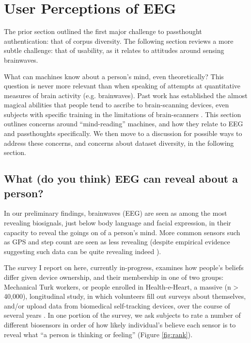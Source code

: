 \documentclass[sigconf]{acmart}
\begin{document}
\section{User Perceptions of EEG}
\label{sec:orgb5062f2}

The prior section outlined the first major challenge to passthought authentication: that of corpus diversity.
The following section reviews a more subtle challenge: that of usability, as it relates to attitudes around sensing brainwaves.

What can machines know about a person's mind, even theoretically? 
This question is never more relevant than when speaking of attempts at quantitative measures of brain activity (e.g. brainwaves).
Past work has established the almost magical abilities that people tend to ascribe to brain-scanning devices, even subjects with specific training in the limitations of brain-scanners \cite{Ali2014a}.
This section outlines concerns around ``mind-reading'' machines, and how they relate to EEG and passthoughts specifically.
We then move to a discussion for possible ways to address these concerns, and concerns about dataset diversity, in the following section.

\subsection{What (do you think) EEG can reveal about a person?}
\label{sec:orgbe3e326}

In our preliminary findings, brainwaves (EEG) are seen as among the most revealing biosignals, just below body language and facial expression, in their capacity to reveal the goings on of a person's mind. 
More common sensors such as GPS and step count are seen as less revealing (despite empirical evidence suggesting such data can be quite revealing indeed \cite{Canzian2015}).

The survey I report on here, currently in-progress, examines how people's beliefs differ given device ownership, and their membership in one of two groups: Mechanical Turk workers, or people enrolled in Health-e-Heart, a massive (n > 40,000), longitudinal study, in which volunteers fill out surveys about themselves, and/or upload data from biomedical self-tracking devices, over the course of several years \cite{Estrin2010a}.
In one portion of the survey, we ask subjects to rate a number of different biosensors in order of how likely individual's believe each sensor is to reveal what ``a person is thinking or feeling'' (Figure \ref{fig:rank}).
\end{document}
